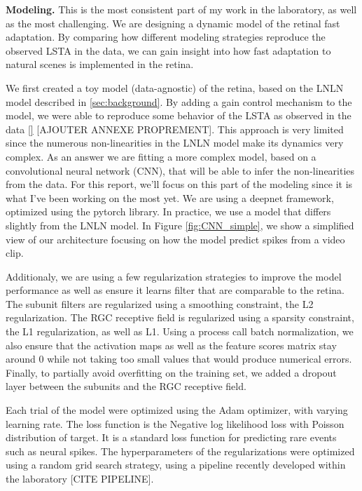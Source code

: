 
\textbf{Modeling.} This is the most consistent part of my work in the
laboratory, as well as the
most challenging. We are designing a dynamic model of the retinal fast
adaptation.
By comparing how different modeling strategies reproduce the
observed LSTA in the data, we can gain insight into how fast adaptation to
natural scenes is implemented in the retina.

We first created a toy model (data-agnostic) of the retina, based on the LNLN
model described
in \ref{sec:background}. By adding a gain control mechanism to the model, we
were able to reproduce some behavior of the LSTA as observed in the data \ref{}
[AJOUTER ANNEXE PROPREMENT].
This approach is very limited since the numerous non-linearities in the LNLN
model make its dynamics very complex.
As an answer we are fitting a more complex model, based on a convolutional
neural network (CNN), that will be able to infer the non-linearities from the
data. For this report, we'll focus on this part of the modeling since it is
what I've been working on the most yet.
We are using a deepnet framework, optimized using the
pytorch library. In practice, we use a model that differs slightly from the
LNLN
model. In Figure \ref*{fig:CNN_simple}, we show a simplified view of our
architecture focusing on how the model predict spikes from a video clip.

Additionaly, we are using a few regularization strategies to improve the model
performance as well as ensure it learns filter that are comparable to the
retina. %
The subunit filters are regularized using a smoothing constraint, the L2
regularization. The RGC receptive field is regularized using a sparsity
constraint, the L1 regularization, as well as L1. Using a process call batch
normalization, we also ensure that the activation maps as well as the feature
scores matrix stay around 0 while not taking too small values that would
produce numerical errors. Finally, to partially avoid overfitting on the
training set, we added a dropout layer between the subunits and the RGC
receptive field.

Each trial of the model were optimized using the Adam optimizer, with varying
learning rate. The loss function is the Negative log likelihood loss with
Poisson distribution of target. It is a standard loss function for predicting
rare events such as neural spikes.
The hyperparameters of the regularizations were optimized using a random grid
search strategy, using a pipeline recently developed within the laboratory
    [CITE PIPELINE]. %

